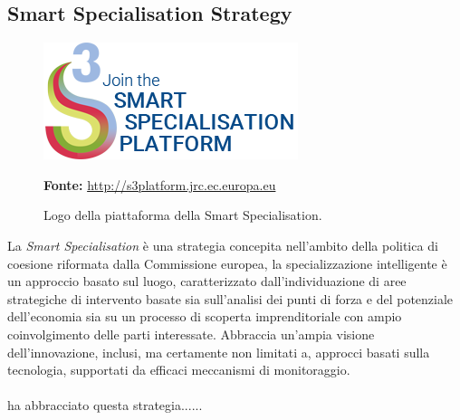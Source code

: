 \subsection{Smart Specialisation Strategy}
\begin{figure}[H]
	\begin{center}
	\includegraphics[scale=0.4]{immagini/join-s3p.png}
	\caption{Logo della piattaforma della Smart Specialisation.}
	\small{\textbf{Fonte:} \url{http://s3platform.jrc.ec.europa.eu}}
	\end{center}
\end{figure}

La \textit{Smart Specialisation} è una strategia concepita nell'ambito della politica di coesione riformata dalla Commissione europea, la specializzazione intelligente è un approccio basato sul luogo, caratterizzato dall'individuazione di aree strategiche di intervento basate sia sull'analisi dei punti di forza e del potenziale dell'economia sia su un processo di scoperta imprenditoriale con ampio coinvolgimento delle parti interessate. Abbraccia un'ampia visione dell'innovazione, inclusi, ma certamente non limitati a, approcci basati sulla tecnologia, supportati da efficaci meccanismi di monitoraggio.\\
\\
\lab{} ha abbracciato questa strategia......
